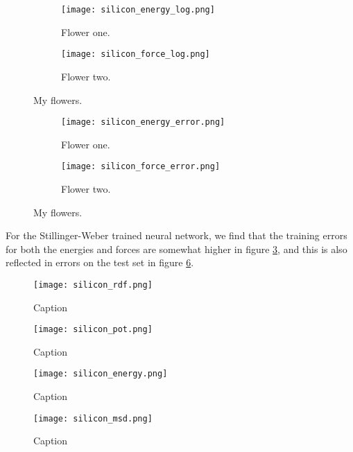 \begin{figure}[H]
\begin{adjustbox}{max width=1.2\linewidth,center}
\centering
  \begin{subfigure}[b]{0.55\textwidth}
      \texttt{[image: silicon\_energy\_log.png]}
    \caption{Flower one.}
    \label{fig:f1}
  \end{subfigure}
  \hfill
  \begin{subfigure}[b]{0.55\textwidth}
      \texttt{[image: silicon\_force\_log.png]}
    \caption{Flower two.}
    \label{fig:f2}
  \end{subfigure}
\end{adjustbox}
\caption{My flowers.}
    \label{fig:silicon-log}
\end{figure}

\begin{figure}[H]
\begin{adjustbox}{max width=1.2\linewidth,center}
\centering
  \begin{subfigure}[b]{0.55\textwidth}
      \texttt{[image: silicon\_energy\_error.png]}
    \caption{Flower one.}
    \label{fig:f1}
  \end{subfigure}
  \hfill
  \begin{subfigure}[b]{0.55\textwidth}
      \texttt{[image: silicon\_force\_error.png]}
    \caption{Flower two.}
    \label{fig:f2}
  \end{subfigure}
\end{adjustbox}
\caption{My flowers.}
    \label{fig:silicon-error}
\end{figure}

For the Stillinger-Weber trained neural network, we find that
the training errors for both the energies and forces are somewhat higher
in figure \ref{fig:silicon-log},
and this is also reflected in errors on the test set in figure \ref{fig:silicon-error}.


\begin{figure}[H]
    \centering
    \texttt{[image: silicon\_rdf.png]}
    \caption{Caption}
    \label{fig:silicon-rdf}
\end{figure}

\begin{figure}[H]
    \centering
    \texttt{[image: silicon\_pot.png]}
    \caption{Caption}
    \label{fig:silicon-energy}
\end{figure}

\begin{figure}[H]
    \centering
    \texttt{[image: silicon\_energy.png]}
    \caption{Caption}
    \label{fig:silicon-energy}
\end{figure}

\begin{figure}[H]
    \centering
    \texttt{[image: silicon\_msd.png]}
    \caption{Caption}
    \label{fig:silicon-energy}
\end{figure}
